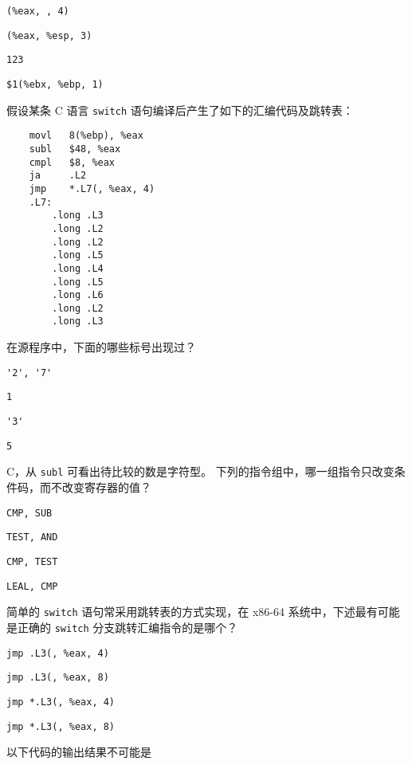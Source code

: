 \begin{problems}
\begin{choices}
            \item \verb|(%eax, , 4)|
            \item \verb|(%eax, %esp, 3)|
            \item \verb|123|
            \item \verb|$1(%ebx, %ebp, 1)|
        \end{choices}
         假设某条 C 语言 \verb|switch| 语句编译后产生了如下的汇编代码及跳转表：
        \begin{verbatim}
    movl   8(%ebp), %eax
    subl   $48, %eax
    cmpl   $8, %eax
    ja     .L2
    jmp    *.L7(, %eax, 4)
    .L7:
        .long .L3
        .long .L2
        .long .L2
        .long .L5
        .long .L4
        .long .L5
        .long .L6
        .long .L2
        .long .L3
        \end{verbatim}
        在源程序中，下面的哪些标号出现过？
        \begin{choices}
            \item \verb|'2', '7'|
            \item \verb|1|
            \item \verb|'3'|
            \item \verb|5|
        \end{choices}
        \sol C，从 \verb|subl| 可看出待比较的数是字符型。
         下列的指令组中，哪一组指令只改变条件码，而不改变寄存器的值？
        \begin{choices}
            \item \verb|CMP, SUB|
            \item \verb|TEST, AND|
            \item \verb|CMP, TEST|
            \item \verb|LEAL, CMP|
        \end{choices}
         简单的 \verb|switch| 语句常采用跳转表的方式实现，在 x86-64 系统中，下述最有可能是正确的 \verb|switch| 分支跳转汇编指令的是哪个？
        \begin{choices}
            \item \verb|jmp .L3(, %eax, 4)|
            \item \verb|jmp .L3(, %eax, 8)|
            \item \verb|jmp *.L3(, %eax, 4)|
            \item \verb|jmp *.L3(, %eax, 8)|
        \end{choices}
         以下代码的输出结果不可能是
        \begin{verbatim}

\end{verbatim}
\end{problems}
